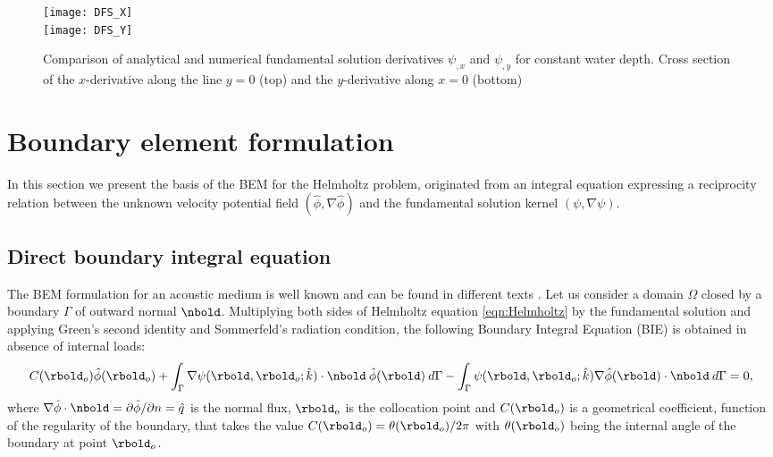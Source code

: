 \begin{figure}[t]
\begin{center}
\texttt{[image: DFS\_X]} \\
\texttt{[image: DFS\_Y]}
\caption{Comparison of analytical and numerical fundamental solution derivatives $\psi_{,x}$ and $\psi_{,y}$ for constant water depth. Cross section of the $x$-derivative along the line $y=0$ (top) and the $y$-derivative along $x=0$ (bottom)}
\label{fig-DFS_XY}
\end{center}
\end{figure}


\section{Boundary element formulation}
\label{sec-BEM}
In this section we present the basis of the BEM for the Helmholtz problem, originated from an integral equation expressing a reciprocity relation between the unknown velocity potential field $(\hat{\phi},\nabla \hat{\phi})$ and the fundamental solution kernel $(\psi,\nabla \psi)$.

\subsection{Direct boundary integral equation}
The BEM formulation for an acoustic medium is well known and can be found in different texts \cite{Wu2000,Atalla2015}. Let us consider a domain $\Omega$ closed by a boundary $\Gamma$ of outward normal $\nbold$. Multiplying both sides of Helmholtz equation \eqref{eqn:Helmholtz} by the fundamental solution and applying Green's second identity and Sommerfeld's radiation condition, the following Boundary Integral Equation (BIE) is obtained in absence of internal loads:
%
\begin{equation}
C(\rbold_o) \hat{\phi}(\rbold_o)  
+ 
\int_{\Gamma}  \nabla \psi(\rbold,\rbold_o;\hat{k}) \cdot \nbold \: \hat{\phi}(\rbold) \:d\Gamma 
-
\int_{\Gamma} \psi(\rbold,\rbold_o;\hat{k}) \nabla \hat{\phi}(\rbold) \cdot \nbold \:d\Gamma 
= 0,
\label{eqn:BEMBoundaryIntegralEquation}
\end{equation}
%
where $\nabla \hat{\phi} \cdot \nbold = {\partial \hat{\phi}}/{\partial n} =\hat{q}$ is the normal flux, $\rbold_o$ is the collocation point and $C(\rbold_o)$ is a geometrical coefficient, function of the regularity of the boundary, that takes the value $C(\rbold_o) ={\theta(\rbold_o)}/{2\pi}$ with $\theta(\rbold_o)$ being the internal angle of the boundary at point $\rbold_o$. 

